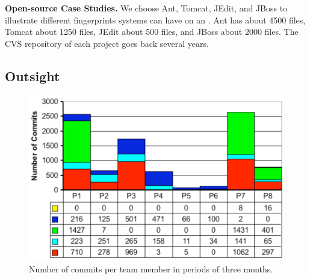 \textbf{Open-source Case Studies.} We choose Ant, Tomcat, JEdit, and JBoss to illustrate different fingerprints systems can have on an \omap. Ant has about 4500 files, Tomcat about 1250 files, JEdit about 500 files, and JBoss about 2000 files. The CVS repository of each project goes back several years.

\subsection{Outsight}\label{sec:outsight}
\begin{figure}[htbp]
\begin{center}
\includegraphics[width=\columnwidth]{fig/chronia-commit-histogram}
\caption{Number of commits per team member in periods of three months.}
\label{fig:histogram}
\end{center}
\end{figure}

